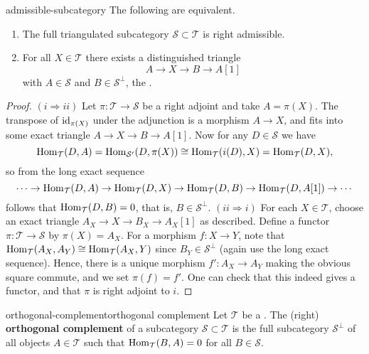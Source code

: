 \begin{example}{admissible-subcategory}
    The following are equivalent.
    \begin{enumerate}[label=(\roman*)]
        \item The full triangulated subcategory $\mathcal{S} \subset \mathcal{T}$ is right admissible.
        \item For all $X \in \mathcal{T}$ there exists a distinguished triangle
        \[ A \to X \to B \to A[1] \]
        with $A \in \mathcal{S}$ and $B \in {\mathcal{S}}^\perp$, the .
    \end{enumerate}
    \begin{proof}
        $(i \Rightarrow ii)$ Let $\pi \colon \mathcal{T} \to \mathcal{S}$ be a right adjoint and take $A = \pi(X)$. The transpose of $\textup{id}_{\pi(X)}$ under the adjunction is a morphism $A \to X$, and fits into some exact triangle $A \to X \to B \to A[1]$. Now for any $D \in \mathcal{S}$ we have
        \[ \operatorname{Hom}_\mathcal{T}(D, A) = \operatorname{Hom}_{\mathcal{S}'}(D, \pi(X)) \cong \operatorname{Hom}_\mathcal{T}(i(D), X) = \operatorname{Hom}_\mathcal{T}(D, X) , \]
        so from the long exact sequence
        \[ \cdots \to \operatorname{Hom}_\mathcal{T}(D, A) \to \operatorname{Hom}_\mathcal{T}(D, X) \to \operatorname{Hom}_\mathcal{T}(D, B) \to \operatorname{Hom}_\mathcal{T}(D, A[1]) \to \cdots \]
        follows that $\operatorname{Hom}_\mathcal{T}(D, B) = 0$, that is, $B \in \mathcal{S}^\perp$.
        $(ii \Rightarrow i)$ For each $X \in \mathcal{T}$, choose an exact triangle $A_X \to X \to B_X \to A_X[1]$ as described. Define a functor $\pi \colon \mathcal{T} \to \mathcal{S}$ by $\pi(X) = A_X$. For a morphism $f \colon X \to Y$, note that $\operatorname{Hom}_\mathcal{T}(A_X, A_Y) \cong \operatorname{Hom}_\mathcal{T}(A_X, Y)$ since $B_Y \in \mathcal{S}^\perp$ (again use the long exact sequence). Hence, there is a unique morphism $f' \colon A_X \to A_Y$ making the obvious square commute, and we set $\pi(f) = f'$. One can check that this indeed gives a functor, and that $\pi$ is right adjoint to $i$.
    \end{proof}
\end{example}

\begin{topic}{orthogonal-complement}{orthogonal complement}
    Let $\mathcal{T}$ be a . The (right) \textbf{orthogonal complement} of a subcategory $\mathcal{S} \subset \mathcal{T}$ is the full subcategory $\mathcal{S}^\perp$ of all objects $A \in \mathcal{T}$ such that $\operatorname{Hom}_\mathcal{T}(B, A) = 0$ for all $B \in \mathcal{S}$.
\end{topic}

